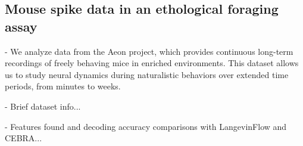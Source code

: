 \subsection{Mouse spike data in an ethological foraging assay}

- We analyze data from the Aeon project, which provides continuous long-term recordings of freely behaving mice in enriched environments. This dataset allows us to study neural dynamics during naturalistic behaviors over extended time periods, from minutes to weeks.

- Brief dataset info...

- Features found and decoding accuracy comparisons with LangevinFlow and CEBRA...


